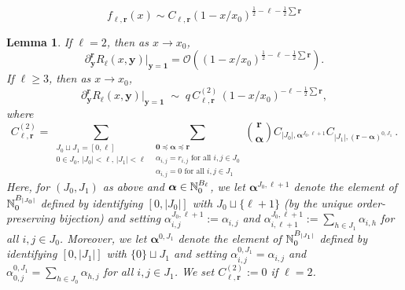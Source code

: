 \documentclass[10pt,a4paper]{amsart}
\newtheorem{lemma}{Lemma}
\newcommand{\abs}[1]{{\left|#1\right|}}
\newcommand{\bN}{\mathbb{N}}
\newcommand{\br}{{\mathbf{r}}}
\newcommand{\by}{{\mathbf{y}}}
\newcommand{\cO}{\mathcal{O}}
\newcommand{\pairs}{{\rm B}}
\begin{document}
\begin{equation}\label{eq: claim singularity fellr}
    f_{\ell,\br}(x) \sim C_{\ell,\br} (1-x/x_0)^{\frac12 - \ell - \frac12 \sum \br}
\end{equation}

\begin{lemma}\label{lem: asymptotics second term Rellr tilde}
    If $\ell=2$, then as $x\to x_0$,
    \begin{equation*}
        \partial_\by^\br R_\ell(x,\by) \vert_{\by=\bm{1}}
        = \cO\left( (1-x/x_0)^{\frac12-\ell-\frac12\sum\br} \right).
    \end{equation*}
    If $\ell\ge3$, then as $x\to x_0$,
    \begin{equation*}
        \partial_\by^\br R_\ell(x,\by) \vert_{\by=\bm{1}}
        \;\sim\;
        q\, C_{\ell,\br}^{(2)}\,
        (1-x/x_0)^{-\ell-\frac12\sum\br},
    \end{equation*}
    where
    \begin{equation*}
        C_{\ell,\br}^{(2)} 
        = \sum_{\substack{ J_0 \sqcup J_1 = [0,\ell] \\ 0\in J_0,\, \abs{J_0}<\ell,\, \abs{J_1}<\ell }}
        \sum_{\substack{ \bm{0}\preceq \bm{\alpha}\preceq \br \\ \alpha_{i,j}=r_{i,j} \text{ for all } i,j\in J_0 \\  \alpha_{i,j}=0 \text{ for all } i,j\in J_1 }}
        \binom{\br}{\bm{\alpha}}
        C_{\abs{J_0}, \bm\alpha^{J_0,\ell+1}}
        C_{\abs{J_1}, (\br-\bm\alpha)^{0,J_1}} \,.
    \end{equation*}
    Here, for $(J_0,J_1)$ as above and $\bm{\alpha} \in \bN_0^{\pairs_\ell}$, we let $\bm{\alpha}^{J_0,\ell+1}$ denote the element of $\bN_0^{\pairs_{\abs{J_0}}}$ defined by identifying $[0,\abs{J_0}]$ with $J_0 \sqcup \{\ell+1\}$ (by the unique order-preserving bijection) and setting $\alpha^{J_0,\ell+1}_{i,j} := \alpha_{i,j}$ and $\alpha^{J_0,\ell+1}_{i,\ell+1} := \sum_{h\in J_1} \alpha_{i,h}$ for all $i,j\in J_0$.
    Moreover, we let $\bm{\alpha}^{0,J_1}$ denote the element of $\bN_0^{\pairs_{\abs{J_1}}}$ defined by identifying $[0,\abs{J_1}]$ with $\{0\} \sqcup J_1$ and setting $\alpha^{0,J_1}_{i,j} = \alpha_{i,j}$ and $\alpha^{0,J_1}_{0,j} = \sum_{h\in J_0} \alpha_{h,j}$ for all $i,j\in J_1$.
    We set $C_{\ell,\br}^{(2)} := 0$ if $\ell=2$.
\end{lemma}
\end{document}
